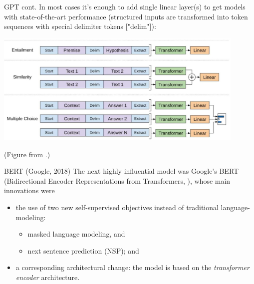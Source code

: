\documentclass[style=upen, size=14pt]{powerdot}
\theoremstyle{definition}
\begin{document}
\begin{slide}[toc=]{GPT cont.}
  In most cases it's enough to add single linear layer(s) to get models with
  state-of-the-art performance (structured inputs are transformed into token
  sequences with special delimiter tokens ["delim"]):
  
  \begin{centering}
    
    \includegraphics[width=0.9\textwidth]{figures/gpt.eps}

    \footnotesize{(Figure from \cite{radford2018improving}.)}
    
  \end{centering}  
\end{slide}

\begin{slide}[toc=BERT]{BERT (Google, 2018)}
  The next highly influential model was Google's BERT (Bidirectional Encoder
  Representations from Transformers, \cite{devlin2018bert}), whose main
  innovations were
  \begin{itemize}
  \item the use of two new self-supervised objectives instead of traditional
    language-modeling:
    \begin{itemize}
    \item masked language modeling, and
    \item next sentence prediction (NSP); and
    \end{itemize}
  \item a corresponding architectural change: the model is based on the
    \emph{transformer encoder} architecture.
  \end{itemize}
\end{slide}
\end{document}
